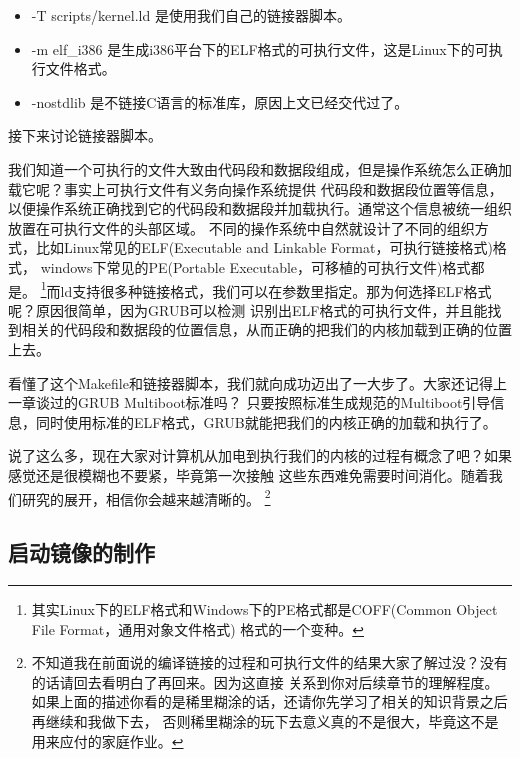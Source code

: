 \begin{itemize}
	\item -T scripts/kernel.ld 是使用我们自己的链接器脚本。
	\item -m elf\_i386 是生成i386平台下的ELF格式的可执行文件，这是Linux下的可执行文件格式。
	\item -nostdlib 是不链接C语言的标准库，原因上文已经交代过了。
\end{itemize}

\par 接下来讨论链接器脚本。

\par 我们知道一个可执行的文件大致由代码段和数据段组成，但是操作系统怎么正确加载它呢？事实上可执行文件有义务向操作系统提供\allowbreak
代码段和数据段位置等信息，以便操作系统正确找到它的代码段和数据段并加载执行。通常这个信息被统一组织放置在可执行文件的头部区域。\allowbreak
不同的操作系统中自然就设计了不同的组织方式，比如Linux常见的ELF(Executable and Linkable Format，可执行链接格式)格式，\allowbreak
windows下常见的PE(Portable Executable，可移植的可执行文件)格式都是。\allowbreak
\footnote{其实Linux下的ELF格式和Windows下的PE格式都是COFF(Common Object File Format，通用对象文件格式)\allowbreak
格式的一个变种。}而ld支持很多种链接格式，我们可以在参数里指定。那为何选择ELF格式呢？原因很简单，因为GRUB可以检测\allowbreak
识别出ELF格式的可执行文件，并且能找到相关的代码段和数据段的位置信息，从而正确的把我们的内核加载到正确的位置上去。

\par 看懂了这个Makefile和链接器脚本，我们就向成功迈出了一大步了。大家还记得上一章谈过的GRUB Multiboot标准吗？\allowbreak
只要按照标准生成规范的Multiboot引导信息，同时使用标准的ELF格式，GRUB就能把我们的内核正确的加载和执行了。

\par 说了这么多，现在大家对计算机从加电到执行我们的内核的过程有概念了吧？如果感觉还是很模糊也不要紧，毕竟第一次接触\allowbreak
这些东西难免需要时间消化。随着我们研究的展开，相信你会越来越清晰的。\allowbreak
\footnote{不知道我在前面说的编译链接的过程和可执行文件的结果大家了解过没？没有的话请回去看明白了再回来。因为这直接\allowbreak
关系到你对后续章节的理解程度。如果上面的描述你看的是稀里糊涂的话，还请你先学习了相关的知识背景之后再继续和我做下去，\allowbreak
否则稀里糊涂的玩下去意义真的不是很大，毕竟这不是用来应付的家庭作业。}

\subsection{启动镜像的制作}

